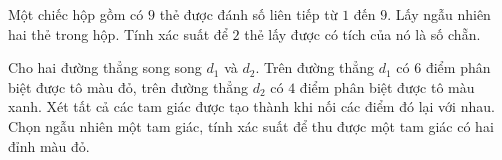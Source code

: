 \begin{vd}%
    Một chiếc hộp gồm có $9$ thẻ được đánh số liên tiếp từ $1$ đến $9$. Lấy ngẫu nhiên hai thẻ trong hộp. Tính xác suất để $2$ thẻ lấy được có tích của nó là số chẵn.
\end{vd}

\begin{vd}%
    Cho hai đường thẳng song song $d_1$ và $d_2$. Trên đường thẳng $d_1$ có $6$ điểm phân biệt được tô  màu đỏ, trên đường thẳng $d_2$ có $4$ điểm phân biệt được tô màu xanh. Xét tất cả các tam giác được tạo thành khi nối các điểm đó lại với nhau. Chọn ngẫu nhiên một tam giác, tính xác suất để thu được một tam giác có hai đỉnh màu đỏ.
\end{vd}

